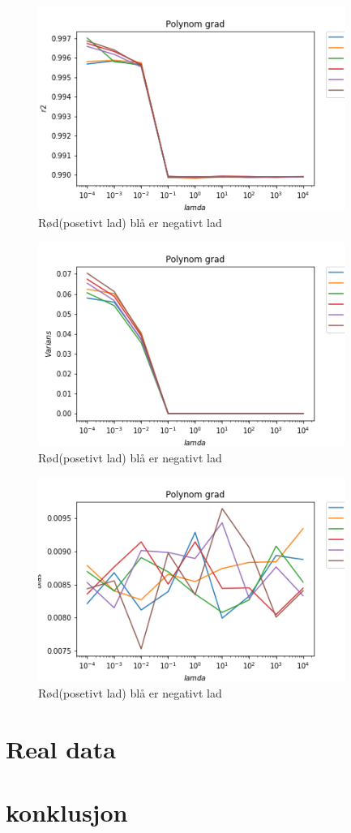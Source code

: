 \documentclass[norsk,a4paper,12pt]{article}
\begin{document}
\begin{figure}[H]
\includegraphics[width=100mm]{r2(L)}
\caption{Rød(posetivt lad)  blå er negativt lad  }
\end{figure}

\begin{figure}[H]
\includegraphics[width=100mm]{var(L)}
\caption{Rød(posetivt lad)  blå er negativt lad  }
\end{figure}

\begin{figure}[H]
\includegraphics[width=100mm]{Bias(L)}
\caption{Rød(posetivt lad)  blå er negativt lad  }
\end{figure}

\section*{Real data}

\section*{konklusjon}
\end{document}
